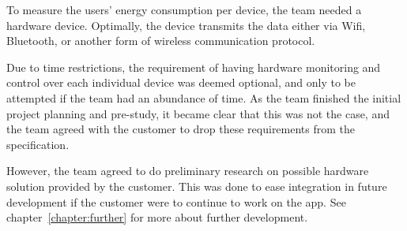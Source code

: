 \noindent To measure the users' energy consumption per device, the team needed a hardware device. Optimally, the device transmits the data either via Wifi, Bluetooth, or another form of wireless communication protocol.

Due to time restrictions, the requirement of having hardware monitoring and control over each individual device was deemed optional, and only to be attempted if the team had an abundance of time. As the team finished the initial project planning and pre-study, it became clear that this was not the case, and the team agreed with the customer to drop these requirements from the specification. 

However, the team agreed to do preliminary research on possible hardware solution provided by the customer. This was done to ease integration in future development if the customer were to continue to work on the app. See chapter~\ref{chapter:further} for more about further development.
 
